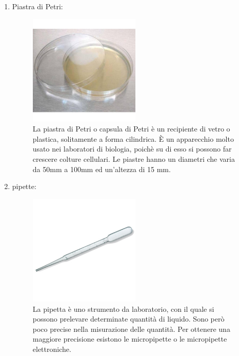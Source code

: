 \documentclass{article}
\begin{document}
\begin{enumerate}
\begin{figure}[H]
		\end{figure}

		\vspace{0.5cm}


		\item Piastra di Petri:

		\begin{figure}[H]
			\includegraphics[width=0.5\textwidth]{./immagini/piastra_petri.jpg}
			\caption{La piastra di Petri o capsula di Petri è un recipiente di vetro o plastica,
			solitamente a forma cilindrica. \`E un apparecchio molto usato nei laboratori di biologia,
			poichè su di esso si possono far crescere colture cellulari.
			Le piastre hanno un diametri che varia da 50mm a 100mm ed un'altezza di 15 mm.}
			\label{piastra_petri}
		\end{figure}

		\vspace{0.5cm}

		\item pipette:

		\begin{figure}[H]

			\includegraphics[width=0.5\textwidth]{./immagini/pipetta.jpg}
			\caption{La pipetta è uno strumento da laboratorio, con il quale si possono prelevare
			determinate quantità di liquido.
			Sono per\`o poco precise nella misurazione delle quantità.
			Per ottenere una maggiore precisione esistono le micropipette o le micropipette elettroniche.}
			\label{pipetta}


\end{figure}
\end{enumerate}
\end{document}
